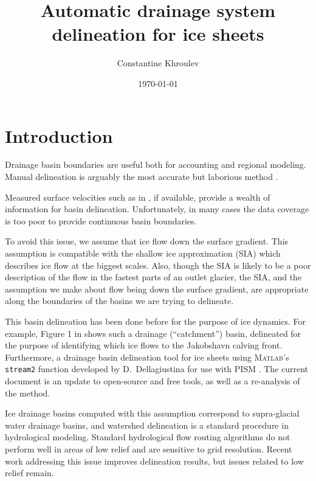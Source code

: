 \documentclass{amsart}
\begin{document}
\title{Automatic drainage system delineation for ice sheets}
\author{Constantine Khroulev}
\date{\today}
\maketitle

\section{Introduction}
\label{sec:introduction}
Drainage basin boundaries are useful both for accounting and regional modeling.
Manual delineation is arguably the most accurate but laborious method \cite{zwally2012}.

Measured surface velocities such as in \cite{joughin2010greenland}, if
available, provide a wealth of information for basin delineation.
Unfortunately, in many cases the data coverage is too poor to provide continuous
basin boundaries.

To avoid this issue, we assume that ice flow down the surface gradient.  This
assumption is compatible with the shallow ice approximation (SIA) which describes ice
flow at the biggest scales.  Also, though the SIA is likely to be a poor description
of the flow in the fastest parts of an outlet glacier, the SIA, and the assumption
we make about flow being down the surface gradient, are appropriate along the
boundaries of the basins we are trying to delineate.

This basin delineation has been done before for the purpose of ice dynamics.
For example, Figure 1 in \cite{Joughinetal2008JGR} shows such a drainage
(``catchment'') basin, delineated for the purpose of identifying which ice flows
to the Jakobshavn calving front.  Furthermore, a drainage basin delineation tool
for ice sheets using \textsc{Matlab}'s \texttt{stream2} function developed by
D.~Dellagiustina for use with PISM \cite{DellaGiustina2011}.  The current
document is an update to open-source and free tools, as well as a re-analysis
of the method.

Ice drainage basins computed with this assumption correspond to supra-glacial
water drainage basins, and watershed delineation is a standard procedure in
hydrological modeling. Standard hydrological flow routing algorithms
\cite{lea1992aspect,jenson1988extracting,costa1994digital} do not perform well
in areas of low relief and are sensitive to grid resolution. Recent work
addressing this issue
\cite{schwanghart2010topotoolbox,seibert2007new,liang2000general,tarboton1997new}
improves delineation results, but issues related to low relief remain.
\end{document}
